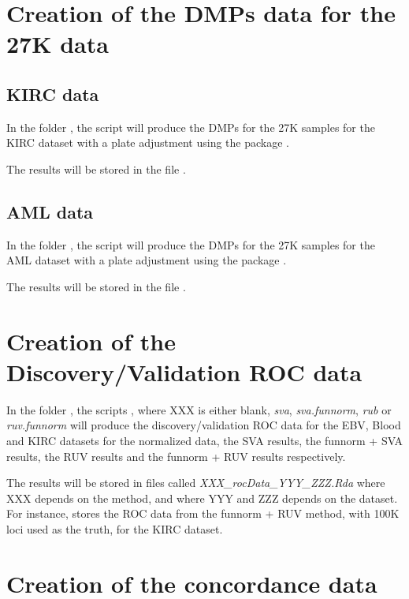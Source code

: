 \documentclass[12pt]{article}
\begin{document}
\section{Creation of the DMPs data for the 27K data}

\subsection{KIRC data}

In the folder , the script  will produce the DMPs for the 27K samples for the KIRC dataset with a plate adjustment using the package . 

The results will be stored in the file .


\subsection{AML data}

In the folder , the script  will produce the DMPs for the 27K samples for the AML dataset with a plate adjustment using the package . 

The results will be stored in the file .

\section{Creation of the Discovery/Validation ROC data}

In the folder , the scripts , where XXX is either blank, \textit{sva}, \textit{sva.funnorm}, \textit{rub} or \textit{ruv.funnorm} will produce the discovery/validation ROC data for the EBV, Blood and KIRC datasets for the normalized data, the SVA results, the funnorm + SVA results, the RUV results and the funnorm + RUV results respectively. 

The results will be stored in files called \textit{XXX\_rocData\_YYY\_ZZZ.Rda} where XXX depends on the method,  and where YYY and ZZZ depends on the dataset.  For instance,  stores the ROC data from the funnorm + RUV method, with 100K loci used as the truth, for the KIRC dataset. 

\section{Creation of the concordance data}
\end{document}
